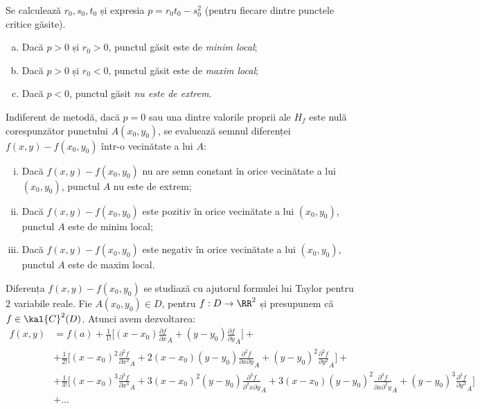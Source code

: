 Se calculează $ r_0, s_0, t_0 $ și expresia $ p = r_0 t_0 - s_0^2 $ (pentru fiecare
dintre punctele critice găsite).
\begin{enumerate}[(a)]
\item Dacă $ p > 0 $ și $ r_0 > 0 $, punctul găsit este de \emph{minim local};
\item Dacă $ p > 0 $ și $ r_0 < 0 $, punctul găsit este de \emph{maxim local};
\item Dacă $ p < 0 $, punctul găsit \emph{nu este de extrem}.
\end{enumerate}

Indiferent de metodă, dacă $ p = 0 $ sau una dintre valorile proprii ale $ H_f $
este nulă corespunzător punctului $ A(x_0, y_0) $, se evaluează semnul diferenței
$ f(x, y) - f(x_0, y_0) $ într-o vecinătate a lui $ A $:
\begin{enumerate}[(i)]
\item Dacă $ f(x, y) - f(x_0, y_0) $ nu are semn constant în orice vecinătate
  a lui $ (x_0, y_0) $, punctul $ A $ nu este de extrem;
\item Dacă $ f(x, y) - f(x_0, y_0) $ este pozitiv în orice vecinătate a lui
  $ (x_0, y_0) $, punctul $ A $ este de minim local;
\item Dacă $ f(x, y) - f(x_0, y_0) $ este negativ în orice vecinătate a lui
  $ (x_0, y_0) $, punctul $ A $ este de maxim local.
\end{enumerate}

Diferența $ f(x, y) - f(x_0, y_0) $ se studiază cu ajutorul formulei lui Taylor
pentru 2 variabile reale. Fie $ A(x_0, y_0) \in D $, pentru $ f : D \to \RR^2 $
și presupunem că $ f \in \kal{C}^2(D) $. Atunci avem dezvoltarea:
\begin{align*}
  f(x, y) &= f(a) + \frac{1}{1!} \Big[ (x - x_0) \frac{\partial f}{\partial x}_A + %
            (y - y_0) \frac{\partial f}{\partial y}_A \Big] + \\
          &+ \frac{1}{2!} \Big[ (x - x_0)^2 \frac{\partial^2 f}{\partial x^2}_A + %
            2(x - x_0)(y - y_0) \frac{\partial^2 f}{\partial x \partial y}_A + %
            (y - y_0)^2 \frac{\partial^2 f}{\partial y^2}_A \Big] + \\
          &+ \frac{1}{3!} \Big[ (x - x_0)^3 \frac{\partial^3 f}{\partial x^3}_A + %
            3(x - x_0)^2(y - y_0) \frac{\partial^3 f}{\partial^2 x \partial y}_A + %
            3(x - x_0)(y - y_0)^2 \frac{\partial^3 f}{\partial x \partial^2 y}_A + %
            (y - y_0)^3 \frac{\partial^3 f}{\partial y^3}_A \Big] \\
          &+ \dots
\end{align*}

